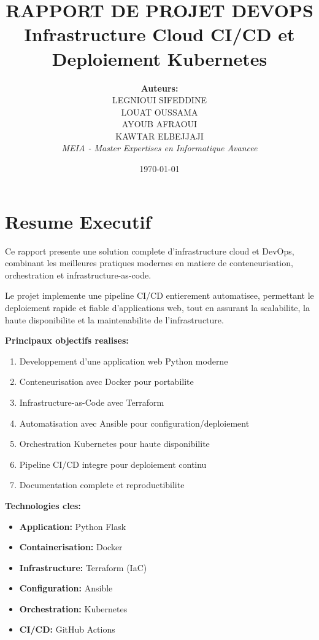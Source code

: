 \documentclass[12pt,a4paper]{report}
\title{
    \textbf{RAPPORT DE PROJET DEVOPS} \\[0.5cm]
    \textbf{Infrastructure Cloud CI/CD et Deploiement Kubernetes}
}
\author{
    \textbf{Auteurs:} \\
    LEGNIOUI SIFEDDINE \\
    LOUAT OUSSAMA \\
    AYOUB AFRAOUI \\
    KAWTAR ELBEJJAJI \\[1cm]
    \textit{MEIA - Master Expertises en Informatique Avancee}
}
\date{\today}
\begin{document}
\maketitle

\newpage

\tableofcontents

\newpage

\chapter*{Resume Executif}

Ce rapport presente une solution complete d'infrastructure cloud et DevOps, combinant les meilleures pratiques modernes en matiere de conteneurisation, orchestration et infrastructure-as-code.

Le projet implemente une pipeline CI/CD entierement automatisee, permettant le deploiement rapide et fiable d'applications web, tout en assurant la scalabilite, la haute disponibilite et la maintenabilite de l'infrastructure.

\textbf{Principaux objectifs realises:}
\begin{enumerate}
    \item Developpement d'une application web Python moderne
    \item Conteneurisation avec Docker pour portabilite
    \item Infrastructure-as-Code avec Terraform
    \item Automatisation avec Ansible pour configuration/deploiement
    \item Orchestration Kubernetes pour haute disponibilite
    \item Pipeline CI/CD integre pour deploiement continu
    \item Documentation complete et reproductibilite
\end{enumerate}

\textbf{Technologies cles:}
\begin{itemize}
    \item \textbf{Application:} Python Flask
    \item \textbf{Containerisation:} Docker
    \item \textbf{Infrastructure:} Terraform (IaC)
    \item \textbf{Configuration:} Ansible
    \item \textbf{Orchestration:} Kubernetes
    \item \textbf{CI/CD:} GitHub Actions
\end{itemize}
\end{document}
